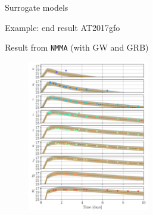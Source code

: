 \documentclass[usenames,dvipsnames,t]{beamer}
\begin{document}
\begin{frame}{Surrogate models}


\end{frame}


\begin{frame}{Example: end result AT2017gfo}
  
  Result from \texttt{NMMA} (with GW and GRB)~\cite{Pang:2022rzc}
  \begin{figure}
    \centering
    \includegraphics[width=0.475\textwidth]{Figures/NMMA_AT2017gfo.png}
  \end{figure}

\end{frame}
\end{document}
